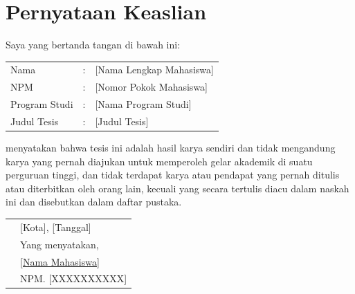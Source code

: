 
\chapter*{Pernyataan Keaslian}

\noindent Saya yang bertanda tangan di bawah ini:

\vspace{0.5cm}
\begin{tabular}{lll}
Nama            & : & [Nama Lengkap Mahasiswa] \\
NPM             & : & [Nomor Pokok Mahasiswa]  \\
Program Studi   & : & [Nama Program Studi]     \\
Judul Tesis     & : & [Judul Tesis]            \\
\end{tabular}
\vspace{0.5cm}

\noindent menyatakan bahwa tesis ini adalah hasil karya sendiri dan tidak mengandung karya yang
pernah diajukan untuk memperoleh gelar akademik di suatu perguruan tinggi, dan tidak terdapat
karya atau pendapat yang pernah ditulis atau diterbitkan oleh orang lain, kecuali yang secara
tertulis diacu dalam naskah ini dan disebutkan dalam daftar pustaka.

\vspace{2cm}

\noindent
\begin{tabular}{p{8cm}p{5cm}}
 & [Kota], [Tanggal] \\[0.2cm]
 & Yang menyatakan, \\[2.5cm]
 & \underline{[Nama Mahasiswa]} \\
 & NPM. [XXXXXXXXXX] \\
\end{tabular}

\clearpage
